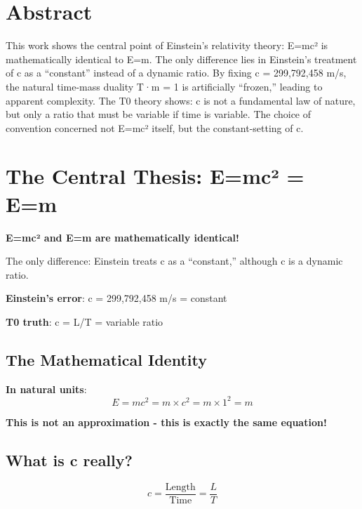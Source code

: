 \section*{Abstract}
		This work shows the central point of Einstein's relativity theory: E=mc² is mathematically identical to E=m. The only difference lies in Einstein's treatment of c as a ``constant'' instead of a dynamic ratio. By fixing c = 299,792,458 m/s, the natural time-mass duality T·m = 1 is artificially ``frozen,'' leading to apparent complexity. The T0 theory shows: c is not a fundamental law of nature, but only a ratio that must be variable if time is variable. The choice of convention concerned not E=mc² itself, but the constant-setting of c.

	
	
	
	\section{The Central Thesis: E=mc² = E=m}
	
	\begin{tcolorbox}[colback=red!5!white,colframe=red!75!black,title=The Central Recognition]
		\textbf{E=mc² and E=m are mathematically identical!}
		
		The only difference: Einstein treats c as a ``constant,'' although c is a dynamic ratio.
		
		\textbf{Einstein's error}: c = 299,792,458 m/s = constant
		
		\textbf{T0 truth}: c = L/T = variable ratio
	\end{tcolorbox}
	
	\subsection{The Mathematical Identity}
	
	\textbf{In natural units}:
	\begin{equation}
		E = mc^2 = m \times c^2 = m \times 1^2 = m
	\end{equation}
	
	\textbf{This is not an approximation - this is exactly the same equation!}
	
	\subsection{What is c really?}
	
	\begin{equation}
		c = \frac{\text{Length}}{\text{Time}} = \frac{L}{T}
	\end{equation}
	
